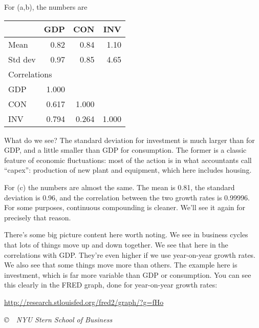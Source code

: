 \documentclass[12pt]{exam}
\renewcommand{\log}{\ln}
\begin{document}
\begin{questions}

\begin{solution}
For (a,b), the numbers are
%
\begin{center}
\begin{tabular}{lrrr}
\toprule
            &   GDP   &  CON  & INV    \\
\midrule
Mean        &  0.82 &  0.84 & 1.10  \\
Std dev     &  0.97 &  0.85 & 4.65  \\
\midrule
\multicolumn{2}{l}{Correlations} \\
GDP         &  1.000 \\
CON         &  0.617 & 1.000 \\
INV         &  0.794 & 0.264 & 1.000 \\
\bottomrule
\end{tabular}
\end{center}
%
What do we see?  The standard deviation for investment
is much larger than for GDP,
and a little smaller than GDP for consumption.
The former is a classic feature of economic fluctuations:
most of the action is in what accountants call ``capex'':
production of new plant and equipment, which here includes housing.

For (c) the numbers are almost the same.
The mean is 0.81, the standard deviation is 0.96,
and the correlation between the two growth rates is 0.99996.
For some purposes, continuous compounding is cleaner.
We'll see it again for precisely that reason.

There's some big picture content here worth noting.
We see in business cycles that lots of things move up and down together.
We see that here in the correlations with GDP.
They're even higher if we use year-on-year growth rates.
We also see that some things move more than others.
The example here is investment,
which is far more variable than GDP or consumption.
You can see this clearly in the FRED graph, done
for year-on-year growth rates:

\vspace*{\parskip}
\centerline{\url{http://research.stlouisfed.org/fred2/graph/?g=fHo}}
\end{solution}

\end{questions}
\embedfilefinish

\vfill \centerline{\it \copyright \ \number\year \
NYU Stern School of Business}
\end{document}
